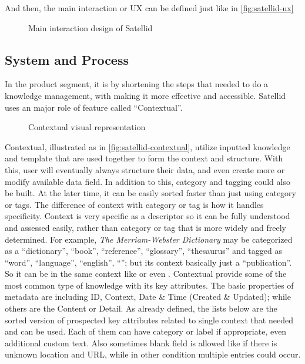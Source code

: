 And then, the main interaction or \ac{UX} can be defined just like in \autoref{fig:satellid-ux}

\begin{figure}[htb]
    \centering
    \caption{Main interaction design of Satellid}
    \label{fig:satellid-ux}
\end{figure}

\subsection{System and Process}

In the product segment, it is by shortening the steps that needed to do a knowledge management, with making it more effective and accessible.
Satellid uses an major role of feature called ``Contextual''.

\begin{figure}[htb]
    \centering
    \caption{Contextual visual representation}
    \label{fig:satellid-contextual}
\end{figure}

Contextual, illustrated as in \autoref{fig:satellid-contextual}, utilize inputted knowledge and template that are used together to form the context and structure.
With this, user will eventually always structure their data, and even create more or modify available data field.
In addition to this, category and tagging could also be built.
At the later time, it can be easily sorted faster than just using category or tags.
The difference of context with category or tag is how it handles specificity.
Context is very specific as a descriptor so it can be fully understood and assessed easily, rather than category or tag that is more widely and freely determined.
For example, \textit{The Merriam-Webster Dictionary} may be categorized as a ``dictionary'', ``book'', ``reference'', ``glossary'', ``thesaurus'' and tagged as ``word'', ``language'', ``english'', ``''; but its context basically just a ``publication''.
So it can be in the same context like  or even .
Contextual provide some of the most common type of knowledge with its key attributes.
The basic properties of metadata are including ID, Context, Date \& Time (Created \& Updated); while others are the Content or Detail.
As already defined, the lists below are the sorted version of prospected key attributes related to single context that needed and can be used.
Each of them can have category or label if appropriate, even additional custom text.
Also sometimes blank field is allowed like if there is unknown location and URL, while in other condition multiple entries could occur.

